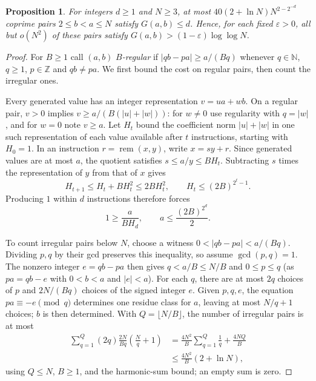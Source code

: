 \documentclass[11pt]{article}
\newtheorem{proposition}[theorem]{Proposition}
\theoremstyle{remark}
\newcommand{\rem}{\operatorname{rem}}
\begin{document}
\begin{proposition}\label{prop:loglog}
For integers $d\geq1$ and $N\geq3$, at most
$40(2+\ln N)N^{2-2^{-d}}$ coprime pairs $2\leq b<a\leq N$ satisfy
$G(a,b)\leq d$. Hence, for each fixed $\varepsilon>0$, all but $o(N^2)$ of
these pairs satisfy $G(a,b)>(1-\varepsilon)\log\log N$.
\end{proposition}

\begin{proof}
For $B\geq1$ call $(a,b)$ \emph{$B$-regular} if
$|qb-pa|\geq a/(Bq)$ whenever $q\in\mathbb N$, $q\geq1$,
$p\in\mathbb Z$ and $qb\neq pa$. We first bound the cost on regular
pairs, then count the irregular ones.

Every generated value has an integer representation $v=ua+wb$.
On a regular pair, $v>0$ implies $v\geq a/(B(|u|+|w|))$:
for $w\neq0$ use regularity with $q=|w|$, and for $w=0$ note $v\geq a$.
Let $H_t$ bound the coefficient norm $|u|+|w|$ in one such representation
of each value available after $t$ instructions, starting with $H_0=1$.
In an instruction $r=\rem(x,y)$, write $x=sy+r$. Since generated values
are at most $a$, the quotient satisfies $s\leq a/y\leq BH_t$.
Subtracting $s$ times the representation of $y$ from that of $x$ gives
\[
H_{t+1}\leq H_t+BH_t^2\leq2BH_t^2,\qquad
H_t\leq(2B)^{2^t-1}.
\]
Producing $1$ within $d$ instructions therefore forces
\[
1\geq\frac{a}{BH_d},\qquad a\leq\frac{(2B)^{2^d}}2.
\]

To count irregular pairs below $N$, choose a witness
$0<|qb-pa|<a/(Bq)$. Dividing $p,q$ by their gcd preserves this inequality,
so assume $\gcd(p,q)=1$. The nonzero integer $e=qb-pa$ then gives
$q<a/B\leq N/B$ and $0\leq p\leq q$ (as $pa=qb-e$ with $0<b<a$ and
$|e|<a$).
For each $q$, there are at most $2q$ choices of $p$ and $2N/(Bq)$ choices
of the signed integer $e$. Given $p,q,e$, the equation
$pa\equiv-e\pmod q$ determines one residue class for $a$, leaving at most
$N/q+1$ choices; $b$ is then determined. With $Q=\lfloor N/B\rfloor$,
the number of irregular pairs is at most
\[
\begin{aligned}
\sum_{q=1}^{Q}(2q)\frac{2N}{Bq}\left(\frac Nq+1\right)
 &=\frac{4N^2}{B}\sum_{q=1}^{Q}\frac1q+\frac{4NQ}{B}\\
 &\leq\frac{4N^2}{B}(2+\ln N),
\end{aligned}
\]
using $Q\leq N$, $B\geq1$, and the harmonic-sum bound; an empty sum is zero.


\end{proof}
\end{document}
